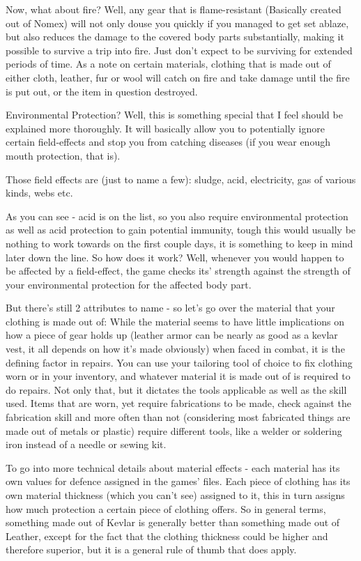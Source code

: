 Now, what about fire? Well, any gear that is flame-resistant (Basically created out of Nomex) will not only douse you quickly if you managed to get set ablaze, but also reduces the damage to the covered body parts substantially, making it possible to survive a trip into fire. Just don't expect to be surviving for extended periods of time.
As a note on certain materials, clothing that is made out of either cloth, leather, fur or wool will catch on fire and take damage until the fire is put out, or the item in question destroyed.

Environmental Protection? Well, this is something special that I feel should be explained more thoroughly. It will basically allow you to potentially ignore certain field-effects and stop you from catching diseases (if you wear enough mouth protection, that is).

Those field effects are (just to name a few): sludge, acid, electricity, gas of various kinds, webs etc.

As you can see - acid is on the list, so you also require environmental protection as well as acid protection to gain potential immunity, tough this would usually be nothing to work towards on the first couple days, it is something to keep in mind later down the line.
So how does it work?
Well, whenever you would happen to be affected by a field-effect, the game checks its' strength against the strength of your environmental protection for the affected body part.

But there's still 2 attributes to name - so let's go over the material that your clothing is made out of: While the material seems to have little implications on how a piece of gear holds up (leather armor can be nearly as good as a kevlar vest, it all depends on how it's made obviously) when faced in combat, it is the defining factor in repairs. You can use your tailoring tool of choice to fix clothing worn or in your inventory, and whatever material it is made out of is required to do repairs. Not only that, but it dictates the tools applicable as well as the skill used. Items that are worn, yet require fabrications to be made, check against the fabrication skill and more often than not (considering most fabricated things are made out of metals or plastic) require different tools, like a welder or soldering iron instead of a needle or sewing kit.

To go into more technical details about material effects - each material has its own values for defence assigned in the games' files. Each piece of clothing has its own material thickness (which you can't see) assigned to it, this in turn assigns how much protection a certain piece of clothing offers. So in general terms, something made out of Kevlar is generally better than something made out of Leather, except for the fact that the clothing thickness could be higher and therefore superior, but it is a general rule of thumb that does apply.

